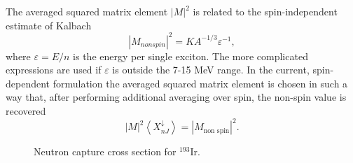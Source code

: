 \documentclass[twocolumn,amsmath,amssymb,10pt,groupedaddress,a4paper]{revtex4}
\begin{document}
The averaged squared matrix element $|M|^{2}$ is related to the spin-independent
estimate of Kalbach \cite{Kalbach}
\begin{equation}
|M_{nonspin}|^{2}=KA^{-1/3}\varepsilon^{-1},
\end{equation}
\noindent where $\varepsilon=E/n$ is the energy per single exciton. The more
complicated expressions \cite{Kalbach} are used if $\varepsilon$
is outside the 7-15 MeV range. In the current, spin-dependent formulation
the averaged squared matrix element is chosen in such a way that,
after performing additional averaging over spin, the non-spin value
is recovered
\begin{equation}
|M|^{2}\left\langle X_{nJ}^{\downarrow}\right\rangle =|M_{\text{non spin}}|^{2}.
\end{equation}
\begin{figure}[htbp]
\caption{Neutron capture cross section for $^{193}$Ir. }
\label{ir193}
\end{figure}
\end{document}
